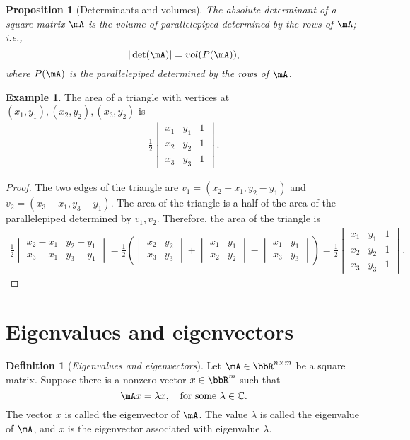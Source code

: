 \documentclass[11pt]{article}
\theoremstyle{plain}
\newtheorem{prop}{Proposition}
\theoremstyle{definition}
\newtheorem{defn}{Definition}
\newtheorem{example}{Example}
\begin{document}
\begin{prop}[Determinants and volumes]
The absolute determinant of a square matrix $\mA$ is the volume of parallelepiped determined by the rows of $\mA$; i.e.,
	\[ |\det(\mA)| = vol(P(\mA)), \]
	where $P(\mA)$ is the parallelepiped determined by the rows of $\mA$.
\end{prop}

\begin{example}
	The area of a triangle with vertices at $(x_1,y_1), (x_2,y_2), (x_3,y_2)$ is
	\begin{align}
		\frac{1}{2} \begin{vmatrix}
			x_1 & y_1 & 1\\
			x_2 & y_2 & 1\\
			x_3 & y_3 & 1
		\end{vmatrix}.
	\end{align}
	
	\begin{proof}
		The two edges of the triangle are $v_1 = (x_2 - x_1, y_2 -y_1)$ and $v_2 = (x_3 - x_1, y_3 -y_1)$. The area of the triangle is a half of the area of the parallelepiped determined by $v_1, v_2$. Therefore, the area of the triangle is 
		\begin{align}
			\frac{1}{2} \begin{vmatrix}
				x_2 - x_1 &  y_2 - y_1\\
				x_3 - x_1& y_3 -y_1
			\end{vmatrix} =  \frac{1}{2} \left(  \begin{vmatrix}
				x_2  &  y_2 \\
				x_3 & y_3
			\end{vmatrix} + \begin{vmatrix}
				x_1 &  y_1\\
				x_2& y_2
			\end{vmatrix}  - \begin{vmatrix}
				x_1 &  y_1\\
				x_3 & y_3 
			\end{vmatrix}    \right) = \frac{1}{2} \begin{vmatrix}
			x_1 & y_1 & 1\\
			x_2 & y_2 & 1\\
			x_3 & y_3 & 1
		\end{vmatrix}.
		\end{align}
	\end{proof}
\end{example}

\section{Eigenvalues and eigenvectors}
\begin{defn}[\textit{Eigenvalues and eigenvectors}]\label{def:eigen}
	Let $\mA \in \bbR^{n \times m}$ be a square matrix. Suppose there is a nonzero vector $x \in \bbR^{m}$ such that
	\[ \mA x = \lambda x, \quad \text{for some } \lambda \in \mathbb{C}. \]
	The vector $x$ is called the eigenvector of $\mA$. The value $\lambda$ is called the eigenvalue of $\mA$, and $x$ is the eigenvector associated with eigenvalue $\lambda$.
\end{defn}
\end{document}
